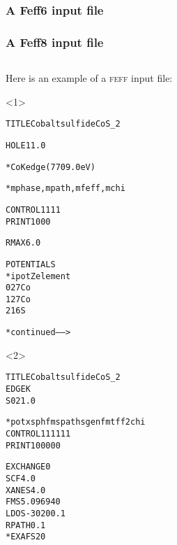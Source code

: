 


\begin{frame}[fragile]
  \frametitle<1>{A Feff6 input file}
  \frametitle<2>{A Feff8 input file}
  \begin{columns}[T]
    \begin{column}{0.44\linewidth}
      Here is an example of a \textsc{feff} input file:


      \begin{onlyenv}<1>
        \begin{block}{}
          \begin{alltt}
            \tiny
 {\color{Green4}TITLE Cobalt sulfide  CoS\_2}

 {\color{Purple2}HOLE} 1 1.0 {\color{Blue4}*  Co K edge (7709.0 eV)

 *         mphase,mpath,mfeff,mchi}
 {\color{SteelBlue2}CONTROL}   1      1     1     1
 {\color{SteelBlue2}PRINT}     1      0     0     0

 {\color{Purple2}RMAX}        6.0


 {\color{Brown4}POTENTIALS}
 {\color{Blue4}*    ipot   Z  element}
        0   27   Co
        1   27   Co
        2   16   S

                  {\color{Blue4}* continued ------>}
          \end{alltt}
        \end{block}
      \end{onlyenv}
      \begin{onlyenv}<2>
        \begin{block}{}
          \begin{alltt}
            \tiny
 {\color{Green4}TITLE Cobalt sulfide  CoS\_2}
 {\color{Purple2}EDGE} K
 {\color{Purple2}S02}  1.0

 {\color{Blue4} *    pot    xsph  fms   paths genfmt ff2chi}
 {\color{SteelBlue2}CONTROL}   1      1     1     1     1     1
 {\color{SteelBlue2}PRINT}     1      0     0     0     0     0

 {\color{Purple2}EXCHANGE}   0
 {\color{Purple2}SCF}        4.0
 {\color{Purple2}XANES}      4.0
 {\color{Purple2}FMS}        5.09694  0
 {\color{Purple2}LDOS}      -30   20     0.1
 {\color{Purple2}RPATH}      0.1
 {\color{Blue4}*EXAFS     20}


\end{alltt}
\end{block}
\end{onlyenv}
\end{column}
\end{columns}
\end{frame}
